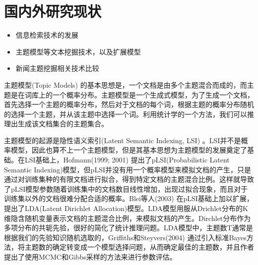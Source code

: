 \section{国内外研究现状}

\begin{itemize}
\item 信息检索技术的发展
\item 主题模型等文本挖掘技术，以及扩展模型
\item 新闻主题挖掘相关技术比较
\end{itemize}

主题模型(Topic Models) \cite{steyvers2007probabilistic} 的基本思想是，一个文档是由多个主题混合而成的，而主题是在词库上的一个概率分布。主题模型是一个生成式模型，为了生成一个文档，首先选择一个主题的概率分布，然后对于文档的每个词，根据主题的概率分布随机的选择一个主题，并从该主题中选择一个词。利用统计学的一个方法，我们可以推理出生成该文档集合的主题集合。


主题模型的起源是隐性语义索引(Latent Semantic Indexing, LSI) \cite{deerwester1990indexing}。LSI并不是概率模型，因此也算不上一个主题模型，但是其基本思想为主题模型的发展奠定了基础。在LSI基础上，Hofmann(1999; 2001) \cite{hofmann1999probabilistic, hofmann2001unsupervised} 提出了pLSI(Probabilistic Latent Semantic Indexing)模型，但pLSI并没有用一个概率模型来模拟文档的产生，只是通过对训练集种的有限文档进行拟合，得到特定文档的主题混合比例。这样就导致了pLSI模型参数随着训练集中的文档数目线性增加，出现过拟合现象，而且对于训练集以外的文档很难分配合适的概率。Blei等人(2003) \cite{Blei:2003} 在pLSI基础上加以扩展，提出了LDA(Latent Dirichlet Allocation)模型。LDA模型用服从Drichlet分布的K维隐含随机变量表示文档的主题混合比例，来模拟文档的产生。Dirchlet分布作为多项分布的共轭先验，很好的简化了统计推理问题。LDA模型中，主题数T通常是根据我们的先验知识随机选取的，Griffiths和Steyvers(2004) \cite{griffiths2004finding} 通过引入标准Bayes方法，将主题数的确定转变成一个模型选择问题，从而确定最佳的主题数，并且作者提出了使用MCMC和Gibbs采样的方法来进行参数评估。


